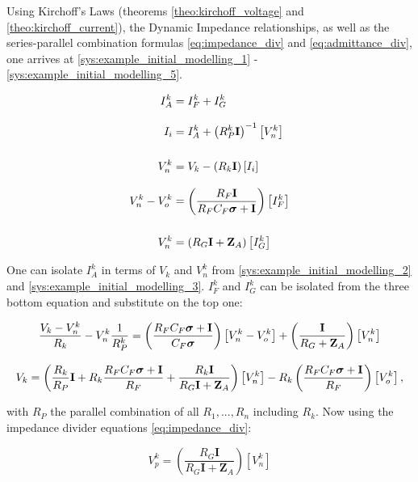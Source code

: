 	Using Kirchoff's Laws (theorems \ref{theo:kirchoff_voltage} and \ref{theo:kirchoff_current}), the Dynamic Impedance relationships, as well as the series-parallel combination formulas \eqref{eq:impedance_div} and \eqref{eq:admittance_div}, one arrives at \eqref{sys:example_initial_modelling_1} - \eqref{sys:example_initial_modelling_5}.

\begin{align}
	I_A^k &= I_F^k + I_G^k \label{sys:example_initial_modelling_1} \\[3mm]
	I_i   &= I_A^k + \left(R_P^k\mathbf{I}\right)^{-1}\left[ V_n^k\right] \label{sys:example_initial_modelling_2}\\[5mm]
	V_n^k &= V_k - \left(R_k\mathbf{I}\right) \left[I_i\right] \label{sys:example_initial_modelling_3}\\[3mm]
	V_n^k - V_o^k &= \left(\dfrac{R_F\mathbf{I}}{R_FC_F \boldsymbol{\sigma} + \mathbf{I}}\right) \left[I_F^k\right] \label{sys:example_initial_modelling_4}\\[5mm]
	V_n^k &= \left(R_G\mathbf{I} + \mathbf{Z}_A\right) \left[I_G^k\right]  \label{sys:example_initial_modelling_5}
\end{align}

	One can isolate $I_A^k$ in terms of $V_k$ and $V_n^k$ from \eqref{sys:example_initial_modelling_2} and \eqref{sys:example_initial_modelling_3}. $I_F^k$ and $I_G^k$ can be isolated from the three bottom equation and substitute on the top one:

\begin{gather}
	\dfrac{V_k - V_n^k}{R_k} - V_n^k \dfrac{1}{R_P^k} = \left(\dfrac{R_FC_F \boldsymbol{\sigma} + \mathbf{I}}{C_F\boldsymbol{\sigma}}\right) \left[V_n^k - V_o^k\right] + \left( \dfrac{\mathbf{I}}{R_G + \mathbf{Z}_A}\right) \left[V_n^k\right] \\[3mm]
	V_k = \left(\dfrac{R_k}{R_P}\mathbf{I} + R_k\dfrac{R_FC_F \boldsymbol{\sigma} + \mathbf{I}}{R_F} + \dfrac{R_k\mathbf{I}}{R_G\mathbf{I} + \mathbf{Z}_A}\right)\left[V_n^k \right] - R_k\left(\dfrac{R_FC_F \boldsymbol{\sigma} + \mathbf{I}}{R_F}\right) \left[V_o^k \right], \label{eq:amplifier_general_kirchoff}
\end{gather}

	\noindent with $R_P$ the parallel combination of all $R_1,...,R_n$ including $R_k$. Now using the impedance divider equations \eqref{eq:impedance_div}:

\begin{equation} V_p^k = \left(\dfrac{R_G\mathbf{I}}{R_G\mathbf{I} + \mathbf{Z}_A}\right) \left[V_n^k\right] \end{equation}

